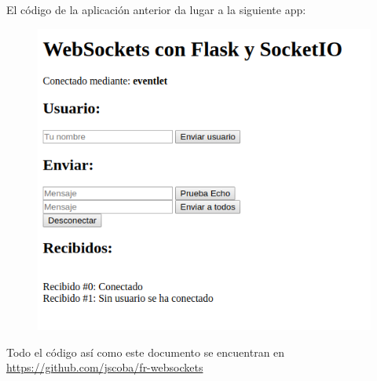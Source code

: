 \documentclass[12pt,a4paper]{article}
\begin{document}
El código de la aplicación anterior da lugar a la siguiente app:
\begin{figure}[H]
\centering
\includegraphics[scale=0.80]{imagenes/app.png}
\end{figure}

Todo el código así como este documento se encuentran en \url{https://github.com/jscoba/fr-websockets}


\nocite{*}
\printbibliography
\end{document}
